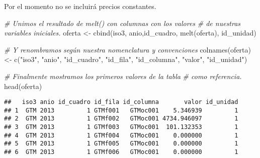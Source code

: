 \documentclass[
]{article}
\newenvironment{Shaded}{\begin{snugshade}}{\end{snugshade}}
\newcommand{\CommentTok}[1]{\textcolor[rgb]{0.56,0.35,0.01}{\textit{#1}}}
\newcommand{\FunctionTok}[1]{\textcolor[rgb]{0.00,0.00,0.00}{#1}}
\newcommand{\NormalTok}[1]{#1}
\newcommand{\OtherTok}[1]{\textcolor[rgb]{0.56,0.35,0.01}{#1}}
\newcommand{\StringTok}[1]{\textcolor[rgb]{0.31,0.60,0.02}{#1}}
\begin{document}
Por el momento no se incluirá precios constantes.

\begin{Shaded}
\begin{Highlighting}[]
\CommentTok{\# Unimos el resultado de melt() con columnas con los valores}
\CommentTok{\# de nuestras variables iniciales.}
\NormalTok{oferta }\OtherTok{\textless{}{-}} \FunctionTok{cbind}\NormalTok{(iso3, anio,id\_cuadro, }\FunctionTok{melt}\NormalTok{(oferta), id\_unidad)}

\CommentTok{\# Y renombramos según nuestra nomenclatura y convenciones}
\FunctionTok{colnames}\NormalTok{(oferta) }\OtherTok{\textless{}{-}}
  \FunctionTok{c}\NormalTok{(}\StringTok{"iso3"}\NormalTok{,}
    \StringTok{"anio"}\NormalTok{,}
    \StringTok{"id\_cuadro"}\NormalTok{,}
    \StringTok{"id\_fila"}\NormalTok{,}
    \StringTok{"id\_columna"}\NormalTok{,}
    \StringTok{"valor"}\NormalTok{,}
    \StringTok{"id\_unidad"}\NormalTok{)}

\CommentTok{\# Finalmente mostramos los primeros valores de la tabla}
\CommentTok{\# como referencia.}
\FunctionTok{head}\NormalTok{(oferta)}
\end{Highlighting}
\end{Shaded}

\begin{verbatim}
##   iso3 anio id_cuadro id_fila id_columna       valor id_unidad
## 1  GTM 2013         1 GTMf001   GTMoc001    5.346939         1
## 2  GTM 2013         1 GTMf002   GTMoc001 4734.946097         1
## 3  GTM 2013         1 GTMf003   GTMoc001  101.132353         1
## 4  GTM 2013         1 GTMf004   GTMoc001    0.000000         1
## 5  GTM 2013         1 GTMf005   GTMoc001    0.000000         1
## 6  GTM 2013         1 GTMf006   GTMoc001    0.000000         1
\end{verbatim}
\end{document}
